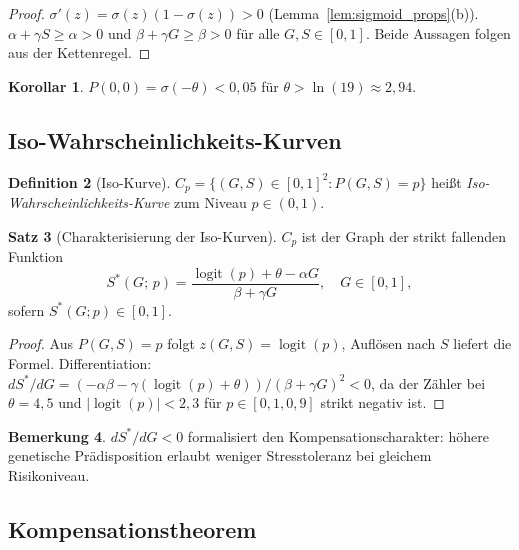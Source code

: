 ﻿\documentclass[12pt, a4paper]{article}
\theoremstyle{definition}
\newtheorem{definition}{Definition}[section]
\newtheorem{satz}[definition]{Satz}
\newtheorem{korollar}[definition]{Korollar}
\newtheorem{bemerkung}[definition]{Bemerkung}
\theoremstyle{remark}
\DeclareMathOperator{\logit}{logit}
\begin{document}
\begin{proof}
$\sigma'(z) = \sigma(z)(1-\sigma(z)) > 0$ (Lemma~\ref{lem:sigmoid_props}(b)).
$\alpha + \gamma S \geq \alpha > 0$ und $\beta + \gamma G \geq \beta > 0$
für alle $G,S \in [0,1]$. Beide Aussagen folgen aus der Kettenregel.
\end{proof}

\begin{korollar}
\label{kor:grenzwerte}
$P(0,0) = \sigma(-\theta) < 0{,}05$ für $\theta > \ln(19) \approx 2{,}94$.
\end{korollar}

\subsection{Iso-Wahrscheinlichkeits-Kurven}

\begin{definition}[Iso-Kurve]
\label{def:isokurve}
$C_p = \{(G,S) \in [0,1]^2 : P(G,S) = p\}$ heißt
\emph{Iso-Wahrschein\-lichkeits-Kurve} zum Niveau $p \in (0,1)$.
\end{definition}

\begin{satz}[Charakterisierung der Iso-Kurven]
\label{satz:isokurven}
$C_p$ ist der Graph der strikt fallenden Funktion
\[
  S^*(G;\,p) = \frac{\logit(p) + \theta - \alpha G}{\beta + \gamma G},
  \quad G \in [0,1],
\]
sofern $S^*(G;p) \in [0,1]$.
\end{satz}

\begin{proof}
Aus $P(G,S) = p$ folgt $z(G,S) = \logit(p)$, Auflösen nach $S$ liefert die Formel.
Differentiation: $dS^*/dG = (-\alpha\beta - \gamma(\logit(p)+\theta))/(\beta+\gamma G)^2 < 0$,
da der Zähler bei $\theta = 4{,}5$ und $|\logit(p)| < 2{,}3$ für $p \in [0{,}1, 0{,}9]$
strikt negativ ist.
\end{proof}

\begin{bemerkung}
$dS^*/dG < 0$ formalisiert den Kompensationscharakter: höhere genetische
Prädisposition erlaubt weniger Stresstoleranz bei gleichem Risikoniveau.
\end{bemerkung}

\subsection{Kompensationstheorem}
\end{document}

